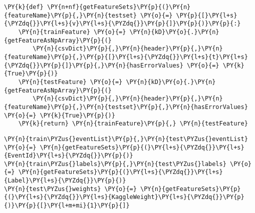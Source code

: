 {\par%
\vspace{-1\baselineskip}%
}%
\begin{notebookcell}[]%
\begin{addmargin}[\cellleftmargin]{0em}%
{\smaller%
\par%
%
\vspace{-1\smallerfontscale}%
\begin{Verbatim}[commandchars=\\\{\}]
\PY{k}{def} \PY{n+nf}{getFeatureSets}\PY{p}{(}\PY{n}{featureName}\PY{p}{,}\PY{n}{testset} \PY{o}{=} \PY{p}{[}\PY{l+s}{\PYZdq{}}\PY{l+s}{v}\PY{l+s}{\PYZdq{}}\PY{p}{]}\PY{p}{)}\PY{p}{:}
    \PY{n}{trainFeature} \PY{o}{=} \PY{n}{kD}\PY{o}{.}\PY{n}{getFeatureAsNpArray}\PY{p}{(}
        \PY{n}{csvDict}\PY{p}{,}\PY{n}{header}\PY{p}{,}\PY{n}{featureName}\PY{p}{,}\PY{p}{[}\PY{l+s}{\PYZdq{}}\PY{l+s}{t}\PY{l+s}{\PYZdq{}}\PY{p}{]}\PY{p}{,}\PY{n}{hasErrorValues} \PY{o}{=} \PY{k}{True}\PY{p}{)}
    \PY{n}{testFeature} \PY{o}{=} \PY{n}{kD}\PY{o}{.}\PY{n}{getFeatureAsNpArray}\PY{p}{(}
        \PY{n}{csvDict}\PY{p}{,}\PY{n}{header}\PY{p}{,}\PY{n}{featureName}\PY{p}{,}\PY{n}{testset}\PY{p}{,}\PY{n}{hasErrorValues} \PY{o}{=} \PY{k}{True}\PY{p}{)}
    \PY{k}{return} \PY{n}{trainFeature}\PY{p}{,} \PY{n}{testFeature}
\end{Verbatim}
%
\par%
\vspace{-1\smallerfontscale}}%
\end{addmargin}
\end{notebookcell}



{\par%
\vspace{-1\baselineskip}%
}%
\begin{notebookcell}[]%
\begin{addmargin}[\cellleftmargin]{0em}%
{\smaller%
\par%
%
\vspace{-1\smallerfontscale}%
\begin{Verbatim}[commandchars=\\\{\}]
\PY{n}{train\PYZus{}eventList}\PY{p}{,}\PY{n}{test\PYZus{}eventList} \PY{o}{=} \PY{n}{getFeatureSets}\PY{p}{(}\PY{l+s}{\PYZdq{}}\PY{l+s}{EventId}\PY{l+s}{\PYZdq{}}\PY{p}{)}
\PY{n}{train\PYZus{}labels}\PY{p}{,}\PY{n}{test\PYZus{}labels} \PY{o}{=} \PY{n}{getFeatureSets}\PY{p}{(}\PY{l+s}{\PYZdq{}}\PY{l+s}{Label}\PY{l+s}{\PYZdq{}}\PY{p}{)}
\PY{n}{test\PYZus{}weights} \PY{o}{=} \PY{n}{getFeatureSets}\PY{p}{(}\PY{l+s}{\PYZdq{}}\PY{l+s}{KaggleWeight}\PY{l+s}{\PYZdq{}}\PY{p}{)}\PY{p}{[}\PY{l+m+mi}{1}\PY{p}{]}
\end{Verbatim}
%
\par%
\vspace{-1\smallerfontscale}}%
\end{addmargin}
\end{notebookcell}


